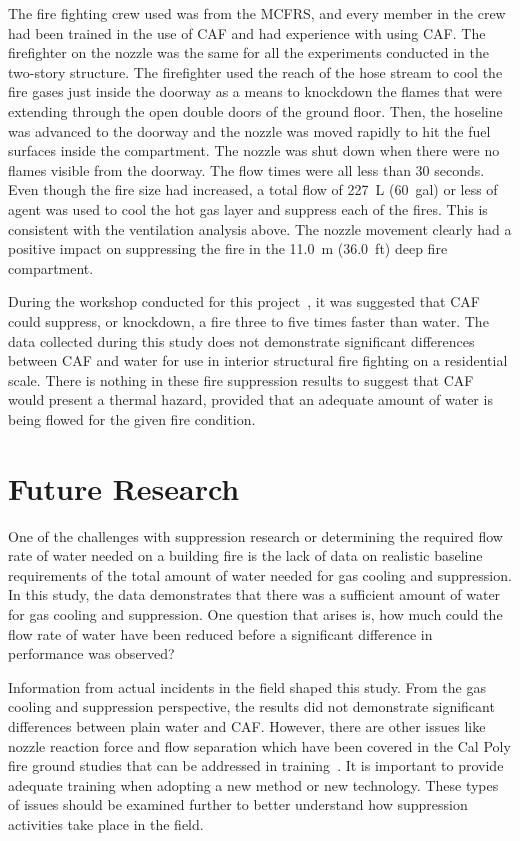 \documentclass[12pt,oneside]{book}
\begin{document}
The fire fighting crew used was from the MCFRS, and every member in the crew had been trained in the use of CAF and had experience with using CAF. The firefighter on the nozzle was the same for all the experiments conducted in the two-story structure. The firefighter used the reach of the hose stream to cool the fire gases just inside the doorway as a means to knockdown the flames that were extending through the open double doors of the ground floor. Then, the hoseline was advanced to the doorway and the nozzle was moved rapidly to hit the fuel surfaces inside the compartment. The nozzle was shut down when there were no flames visible from the doorway. The flow times were all less than 30 seconds. Even though the fire size had increased, a total flow of 227~L (60~gal) or less of agent was used to cool the hot gas layer and suppress each of the fires. This is consistent with the ventilation analysis above. The nozzle movement clearly had a positive impact on suppressing the fire in the 11.0~m (36.0~ft) deep fire compartment.    

During the workshop conducted for this project~\cite{Grant:2011}, it was suggested that CAF could suppress, or knockdown, a fire three to five times faster than water. The data collected during this study does not demonstrate significant differences between CAF and water for use in interior structural fire fighting on a residential scale. There is nothing in these fire suppression results to suggest that CAF would present a thermal hazard, provided that an adequate amount of water is being flowed for the given fire condition.

\section{Future Research}

One of the challenges with suppression research or determining the required flow rate of water needed on a building fire is the lack of data on realistic baseline requirements of the total amount of water needed for gas cooling and suppression. In this study, the data demonstrates that there was a sufficient amount of water for gas cooling and suppression. One question that arises is, how much could the flow rate of water have been reduced before a significant difference in performance was observed? 

Information from actual incidents in the field shaped this study. From the gas cooling and suppression perspective, the results did not demonstrate significant differences between plain water and CAF. However, there are other issues like nozzle reaction force and flow separation which have been covered in the Cal Poly fire ground studies that can be addressed in training~\cite{Carracino:2013,Dicus:2013,LaPolla:2012}.  It is important to provide adequate training when adopting a new method or new technology. These types of issues should be examined further to better understand how suppression activities take place in the field.
\end{document}
